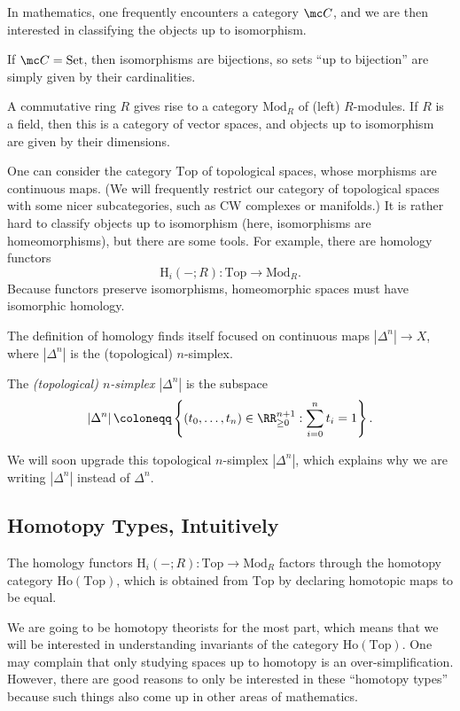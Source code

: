 \documentclass[../notes.tex]{subfiles}
\begin{document}
In mathematics, one frequently encounters a category $\mc C$, and we are then interested in classifying the objects up to isomorphism.
\begin{example}
	If $\mc C=\mathrm{Set}$, then isomorphisms are bijections, so sets ``up to bijection'' are simply given by their cardinalities.
\end{example}
\begin{example}
	A commutative ring $R$ gives rise to a category $\mathrm{Mod}_R$ of (left) $R$-modules. If $R$ is a field, then this is a category of vector spaces, and objects up to isomorphism are given by their dimensions.
\end{example}
\begin{example}
	One can consider the category $\mathrm{Top}$ of topological spaces, whose morphisms are continuous maps. (We will frequently restrict our category of topological spaces with some nicer subcategories, such as CW complexes or manifolds.) It is rather hard to classify objects up to isomorphism (here, isomorphisms are homeomorphisms), but there are some tools. For example, there are homology functors
	\[\mathrm H_i(-;R)\colon\mathrm{Top}\to\mathrm{Mod}_R.\]
	Because functors preserve isomorphisms, homeomorphic spaces must have isomorphic homology.
\end{example}
The definition of homology finds itself focused on continuous maps $\left|\Delta^n\right|\to X$, where $\left|\Delta^n\right|$ is the (topological) $n$-simplex.
\begin{defihelper}[$n$-simplex] 
	The \textit{(topological) $n$-simplex} $\left|\Delta^n\right|$ is the subspace
	\[\left|\Delta^n\right|\coloneqq\left\{(t_0,\ldots,t_n)\in\RR_{\ge0}^{n+1}:\sum_{i=0}^nt_i=1\right\}.\]
\end{defihelper}
We will soon upgrade this topological $n$-simplex $\left|\Delta^n\right|$, which explains why we are writing $\left|\Delta^n\right|$ instead of $\Delta^n$.

\subsection{Homotopy Types, Intuitively}
The homology functors $\mathrm H_i(-;R)\colon\mathrm{Top}\to\mathrm{Mod}_R$ factors through the homotopy category $\mathrm{Ho}(\mathrm{Top})$, which is obtained from $\mathrm{Top}$ by declaring homotopic maps to be equal.

We are going to be homotopy theorists for the most part, which means that we will be interested in understanding invariants of the category $\mathrm{Ho}(\mathrm{Top})$. One may complain that only studying spaces up to homotopy is an over-simplification. However, there are good reasons to only be interested in these ``homotopy types'' because such things also come up in other areas of mathematics.
\end{document}
